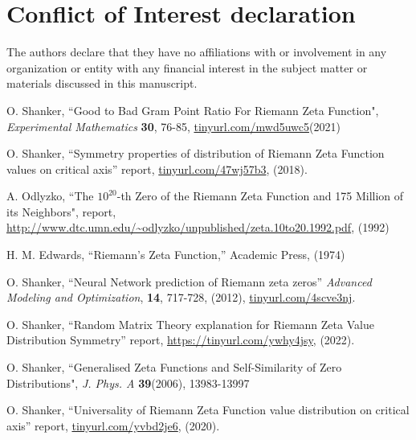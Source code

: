 \documentclass[twoside]{article}
\begin{document}
\section*{Conflict of Interest declaration} 

The authors declare that they have no affiliations with or involvement in any organization 
or entity with any financial interest in the subject matter or materials discussed 
in this manuscript.



\begin{thebibliography}{10}


 O. Shanker, 
``Good to Bad Gram Point Ratio For Riemann Zeta Function",
{\it Experimental Mathematics} {\bf 30}, 76-85,
\url{tinyurl.com/mwd5uwc5}(2021)

 O. Shanker, 
``Symmetry properties of distribution of Riemann Zeta Function values on critical axis''
 report,
\url{tinyurl.com/47wj57b3}, 
(2018). 

  A. Odlyzko,
``The $10^{20}$-th Zero of the Riemann Zeta
Function and 175 Million of its Neighbors", report,
\url{http://www.dtc.umn.edu/~odlyzko/unpublished/zeta.10to20.1992.pdf}, (1992)

 H. M. Edwards, ``Riemann's Zeta Function,''
Academic Press,  (1974)

 O. Shanker, ``Neural Network prediction of Riemann zeta zeros''
{\it Advanced Modeling and Optimization}, {\bf 14}, 717-728, (2012), \url{tinyurl.com/4scve3nj}.


 O. Shanker, 
``Random Matrix Theory explanation for Riemann Zeta Value Distribution Symmetry''
 report,
\url{https://tinyurl.com/ywhy4jsy}, 
(2022). 

 O. Shanker, 
``Generalised Zeta Functions and Self-Similarity of Zero Distributions",
{\it J.  Phys. A} {\bf39}(2006), 13983-13997

 O. Shanker, 
``Universality of Riemann Zeta Function value distribution on critical axis''
 report,
\url{tinyurl.com/yvbd2je6}, 
(2020). 




\end{thebibliography} 
\end{document}
